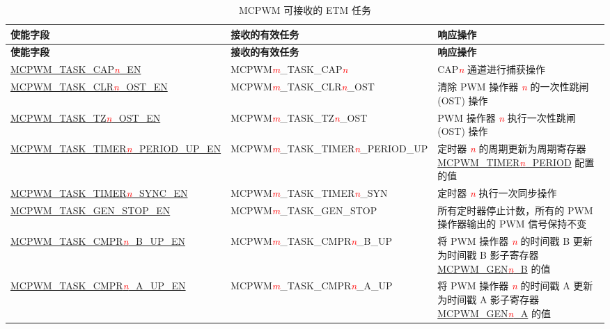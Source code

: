 \begin{longtable}{ | l | l | L{5cm} |}
    \caption{MCPWM 可接收的 ETM 任务}
    \label{tab:mcpwm-etm-task}
    \\\hline
   \textbf{使能字段} & \textbf{接收的有效任务} & \textbf{响应操作} \\\hline
    \endfirsthead
    \hline
    \textbf{使能字段} & \textbf{接收的有效任务} & \textbf{响应操作}  \\\hline
    \endhead
    \hline
    \endfoot
    
    \hyperref[fielddesc:MCPWMTASKCAP0EN]{MCPWM\_TASK\_CAP\textcolor{red}{\it{n}}\_EN}
    &  MCPWM\textcolor{red}{\it{m}}\_TASK\_CAP\textcolor{red}{\it{n}}
    &  CAP\textcolor{red}{\it{n}} 通道进行捕获操作 \\\hline
    \hyperref[fielddesc:MCPWMTASKCLR0OSTEN]{MCPWM\_TASK\_CLR\textcolor{red}{\it{n}}\_OST\_EN}
    &  MCPWM\textcolor{red}{\it{m}}\_TASK\_CLR\textcolor{red}{\it{n}}\_OST
    &  清除 PWM 操作器 \textcolor{red}{\it{n}} 的一次性跳闸 (OST) 操作 \\\hline
    \hyperref[fielddesc:MCPWMTASKTZ0OSTEN]{MCPWM\_TASK\_TZ\textcolor{red}{\it{n}}\_OST\_EN}
    &  MCPWM\textcolor{red}{\it{m}}\_TASK\_TZ\textcolor{red}{\it{n}}\_OST
    &  PWM 操作器 \textcolor{red}{\it{n}} 执行一次性跳闸 (OST) 操作 \\\hline
    \hyperref[fielddesc:MCPWMTASKTIMER0PERIODUPEN]{MCPWM\_TASK\_TIMER\textcolor{red}{\it{n}}\_PERIOD\_UP\_EN}
    &  MCPWM\textcolor{red}{\it{m}}\_TASK\_TIMER\textcolor{red}{\it{n}}\_PERIOD\_UP
    &  定时器 \textcolor{red}{\it{n}} 的周期更新为周期寄存器 \hyperref[fielddesc:MCPWMTIMERNPERIOD]{MCPWM\_TIMER\textcolor{red}{\it{n}}\_PERIOD} 配置的值 \\\hline
    \hyperref[fielddesc:MCPWMTASKTIMER0SYNCEN]{MCPWM\_TASK\_TIMER\textcolor{red}{\it{n}}\_SYNC\_EN}
    &  MCPWM\textcolor{red}{\it{m}}\_TASK\_TIMER\textcolor{red}{\it{n}}\_SYN
    &  定时器 \textcolor{red}{\it{n}} 执行一次同步操作 \\\hline
    \hyperref[fielddesc:MCPWMTASKGENSTOPEN]{MCPWM\_TASK\_GEN\_STOP\_EN}
    &  MCPWM\textcolor{red}{\it{m}}\_TASK\_GEN\_STOP
    &  所有定时器停止计数，所有的 PWM 操作器输出的 PWM 信号保持不变 \\\hline
    \hyperref[fielddesc:MCPWMTASKCMPR0BUPEN]{MCPWM\_TASK\_CMPR\textcolor{red}{\it{n}}\_B\_UP\_EN}
    &  MCPWM\textcolor{red}{\it{m}}\_TASK\_CMPR\textcolor{red}{\it{n}}\_B\_UP
    &  将 PWM 操作器 \textcolor{red}{\it{n}} 的时间戳 B 更新为时间戳 B 影子寄存器 \hyperref[regdesc:MCPWMGENNBREG]{MCPWM\_GEN\textcolor{red}{\it{n}}\_B} 的值 \\\hline
    \hyperref[fielddesc:MCPWMTASKCMPR0AUPEN]{MCPWM\_TASK\_CMPR\textcolor{red}{\it{n}}\_A\_UP\_EN}
    &  MCPWM\textcolor{red}{\it{m}}\_TASK\_CMPR\textcolor{red}{\it{n}}\_A\_UP
    &  将 PWM 操作器 \textcolor{red}{\it{n}} 的时间戳 A 更新为时间戳 A 影子寄存器 \hyperref[regdesc:MCPWMGENNAREG]{MCPWM\_GEN\textcolor{red}{\it{n}}\_A} 的值 \\\hline
\end{longtable}